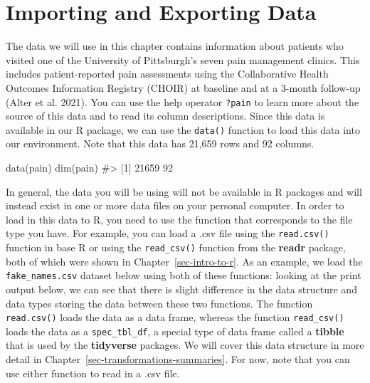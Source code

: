 \documentclass[
  letterpaper,
]{krantz}
\makeatletter
\newenvironment{Shaded}{\begin{snugshade}}{\end{snugshade}}
\newcommand{\CommentTok}[1]{\textcolor[rgb]{0.37,0.37,0.37}{#1}}
\newcommand{\FunctionTok}[1]{\textcolor[rgb]{0.28,0.35,0.67}{#1}}
\newcommand{\NormalTok}[1]{\textcolor[rgb]{0.00,0.23,0.31}{#1}}
\newenvironment{kframe}{%
\medskip{}
\setlength{\fboxsep}{.8em}
 \def\at@end@of@kframe{}%
 \ifinner\ifhmode%
  \def\at@end@of@kframe{\end{minipage}}%
  \begin{minipage}{\columnwidth}%
 \fi\fi%
 \def\FrameCommand##1{\hskip\@totalleftmargin \hskip-\fboxsep
 \colorbox{shadecolor}{##1}\hskip-\fboxsep
     \hskip-\linewidth \hskip-\@totalleftmargin \hskip\columnwidth}%
 \MakeFramed {\advance\hsize-\width
   \@totalleftmargin\z@ \linewidth\hsize
   \@setminipage}}%
 {\par\unskip\endMakeFramed%
 \at@end@of@kframe}
\renewenvironment{Shaded}{\begin{kframe}}{\end{kframe}}
\makeatother
\begin{document}
\section{Importing and Exporting
Data}\label{importing-and-exporting-data}

The data we will use in this chapter contains information about patients
who visited one of the University of Pittsburgh's seven pain management
clinics. This includes patient-reported pain assessments using the
Collaborative Health Outcomes Information Registry (CHOIR) at baseline
and at a 3-month follow-up (Alter et al. 2021). You can use the help
operator \texttt{?pain} to learn more about the source of this data and
to read its column descriptions. Since this data is available in our R
package, we can use the \texttt{data()} function to load this data into
our environment. Note that this data has 21,659 rows and 92 columns.

\begin{Shaded}
\begin{Highlighting}[]
\FunctionTok{data}\NormalTok{(pain)}
\FunctionTok{dim}\NormalTok{(pain)}
\CommentTok{\#\textgreater{} [1] 21659    92}
\end{Highlighting}
\end{Shaded}

In general, the data you will be using will not be available in R
packages and will instead exist in one or more data files on your
personal computer. In order to load in this data to R, you need to use
the function that corresponds to the file type you have. For example,
you can load a .csv file using the \texttt{read.csv()} function in base
R or using the \texttt{read\_csv()} function from the \textbf{readr}
package, both of which were shown in Chapter~\ref{sec-intro-to-r}. As an
example, we load the \texttt{fake\_names.csv} dataset below using both
of these functions: looking at the print output below, we can see that
there is slight difference in the data structure and data types storing
the data between these two functions. The function \texttt{read.csv()}
loads the data as a data frame, whereas the function
\texttt{read\_csv()} loads the data as a \texttt{spec\_tbl\_df}, a
special type of data frame called a \textbf{tibble} that is used by the
\textbf{tidyverse} packages. We will cover this data structure in more
detail in Chapter~\ref{sec-transformations-summaries}. For now, note
that you can use either function to read in a .csv file.
\end{document}
